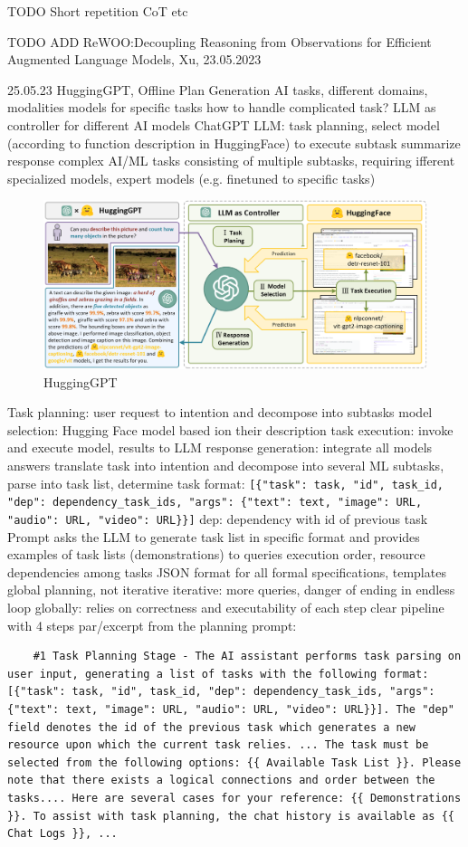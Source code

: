 \documentclass{article}
\begin{document}
TODO Short repetition CoT etc

TODO ADD
ReWOO:Decoupling Reasoning from Observations for Efficient Augmented Language Models, Xu, 23.05.2023 \cite{xu_rewoo_2023}

\cite{shen_hugginggpt_2023} 25.05.23 HuggingGPT, Offline Plan Generation
AI tasks, different domains, modalities
models for specific tasks
how to handle complicated task?
LLM as controller for different AI models
ChatGPT
LLM: task planning, 
select model (according to function description in HuggingFace) to execute subtask
summarize response
complex AI/ML tasks consisting of multiple subtasks, requiring ifferent specialized models, expert models (e.g. finetuned to specific tasks)
\begin{figure}[h]
	\centering
	\includegraphics[width=1.0\linewidth]{HuggingGPT.png}
	\caption{HuggingGPT \cite{shen_hugginggpt_2023}}
	\label{fig:hugginggpt}
\end{figure}
Task planning: user request to intention and decompose into subtasks
model selection: Hugging Face model based ion their description
task execution: invoke and execute model, results to LLM
response generation: integrate all models answers
translate task into intention and decompose into several ML subtasks, parse into task list, determine
task format: \verb|[{"task": task, "id", task_id, "dep": dependency_task_ids, "args": {"text": text, "image": URL, "audio": URL, "video": URL}}]|
dep: dependency with id of previous task
Prompt asks the LLM to generate task list in specific format and provides examples of task lists (demonstrations) to queries execution order, resource dependencies among tasks
JSON format for all formal specifications, templates
global planning, not iterative
iterative: more queries, danger of ending in endless loop
globally: relies on correctness and executability of each step
clear pipeline with 4 steps
par/excerpt from the planning prompt:
\begin{verbatim}
	#1 Task Planning Stage - The AI assistant performs task parsing on user input, generating a list of tasks with the following format: [{"task": task, "id", task_id, "dep": dependency_task_ids, "args": {"text": text, "image": URL, "audio": URL, "video": URL}}]. The "dep" field denotes the id of the previous task which generates a new resource upon which the current task relies. ... The task must be selected from the following options: {{ Available Task List }}. Please note that there exists a logical connections and order between the tasks.... Here are several cases for your reference: {{ Demonstrations }}. To assist with task planning, the chat history is available as {{ Chat Logs }}, ...
\end{verbatim}
\end{document}
